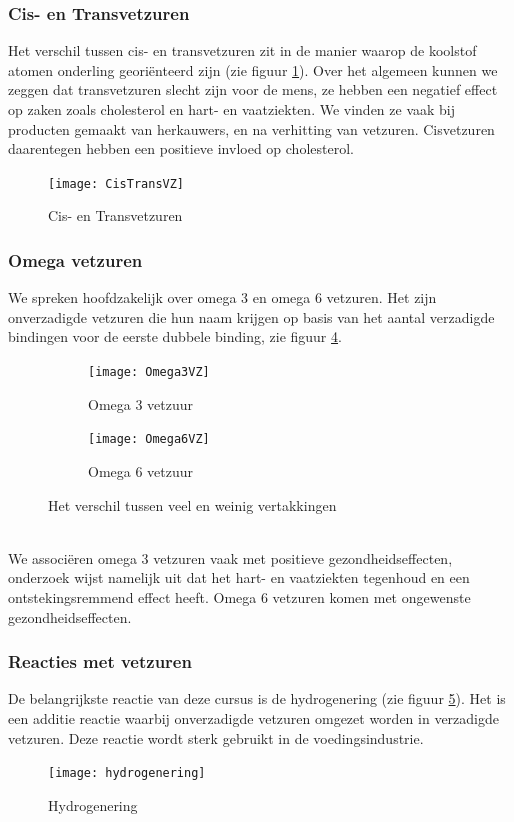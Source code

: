\documentclass[a4paper,kul]{kulakarticle} %
\begin{document}
\subsubsection{Cis- en Transvetzuren}
Het verschil tussen cis- en transvetzuren zit in de manier waarop de koolstof atomen onderling georiënteerd zijn (zie figuur \ref{fig:cistransvz}). Over het algemeen kunnen we zeggen dat transvetzuren slecht zijn voor de mens, ze hebben een negatief effect op zaken zoals cholesterol en hart- en vaatziekten. We vinden ze vaak bij producten gemaakt van herkauwers, en na verhitting van vetzuren. Cisvetzuren daarentegen hebben een positieve invloed op cholesterol.
\begin{figure}[h]
	\centering
	\texttt{[image: CisTransVZ]}
	\caption[Cis en Trans]{Cis- en Transvetzuren}
	\label{fig:cistransvz}
\end{figure}
\newpage
\subsubsection{Omega vetzuren}
We spreken hoofdzakelijk over omega 3 en omega 6 vetzuren. Het zijn onverzadigde vetzuren die hun naam krijgen op basis van het aantal verzadigde bindingen voor de eerste dubbele binding, zie figuur \ref{fig:omegaVZ}. 
\begin{figure}[h]
	\centering
	\begin{subfigure}{.5\textwidth}
		\centering
		\texttt{[image: Omega3VZ]}
		\caption{Omega 3 vetzuur}
		\label{fig:Omega3}
	\end{subfigure}%
	\begin{subfigure}{.5\textwidth}
		\centering
		\texttt{[image: Omega6VZ]}
		\caption{Omega 6 vetzuur}
		\label{fig:Omega6}
	\end{subfigure}
	\caption{Het verschil tussen veel en weinig vertakkingen}
	\label{fig:omegaVZ}
\end{figure}\\
We associëren omega 3 vetzuren vaak met positieve gezondheidseffecten, onderzoek wijst namelijk uit dat het hart- en vaatziekten tegenhoud en een ontstekingsremmend effect heeft. Omega 6 vetzuren komen met ongewenste gezondheidseffecten.
\subsubsection{Reacties met vetzuren}
De belangrijkste reactie van deze cursus is de hydrogenering (zie figuur \ref{fig:hydrogenering}). Het is een additie reactie waarbij onverzadigde vetzuren omgezet worden in verzadigde vetzuren. Deze reactie wordt sterk gebruikt in de voedingsindustrie.
\begin{figure}[h]
	\centering
	\texttt{[image: hydrogenering]}
	\caption[Hydrogenering]{Hydrogenering}
	\label{fig:hydrogenering}
\end{figure}
\end{document}
